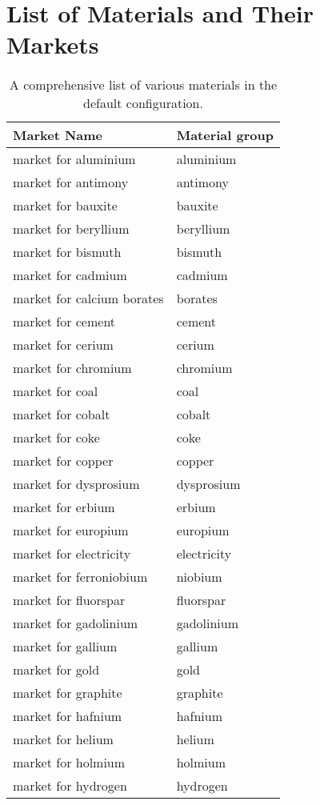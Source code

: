 \documentclass{article}
\begin{document}
\section{List of Materials and Their Markets}

\begin{table}[ht]
\centering
\caption{A comprehensive list of various materials in the default configuration.}
\label{tab:materials}

\begin{tabular}{ll}
\toprule
\textbf{Market Name} & \textbf{Material group} \\
\midrule
market for aluminium & aluminium \\
market for antimony & antimony \\
market for bauxite & bauxite \\
market for beryllium & beryllium \\
market for bismuth & bismuth \\
market for cadmium & cadmium \\
market for calcium borates & borates \\
market for cement & cement \\
market for cerium & cerium \\
market for chromium & chromium \\
market for coal & coal \\
market for cobalt & cobalt \\
market for coke & coke \\
market for copper & copper \\
market for dysprosium & dysprosium \\
market for erbium & erbium \\
market for europium & europium \\
market for electricity & electricity \\
market for ferroniobium & niobium \\
market for fluorspar & fluorspar \\
market for gadolinium & gadolinium \\
market for gallium & gallium \\
market for gold & gold \\
market for graphite & graphite \\
market for hafnium & hafnium \\
market for helium & helium \\
market for holmium & holmium \\
market for hydrogen & hydrogen \\

\end{tabular}
\end{table}
\end{document}
